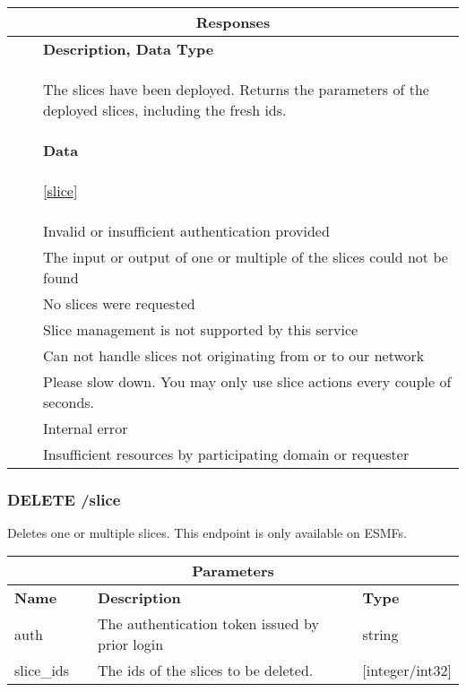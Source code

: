 \begin{longtable}{ |p{1.0cm}|p{3cm}|p{6.44cm}| }
\hline
\multicolumn{3}{|c|}{\textbf{Responses}} \\
 \hline
\centering{\textbf{Code}} & \centering{\textbf{Content Type}} & \textbf{Description, Data Type} \\
\hline
\centering{200} & \centering{application/json} & The slices have been deployed. Returns the parameters of the deployed slices, including the fresh ids.

\paragraph{Data} [\hyperref[esmf_slice]{slice}] \\
 \hline
\endhead
\centering{403} & \centering{text/plain} & Invalid or insufficient authentication provided \\
 \hline
\centering{404} & \centering{text/plain} & The input or output of one or multiple of the slices could not be found \\
 \hline
\centering{417} & \centering{text/plain} & No slices were requested \\
 \hline
\centering{421} & \centering{text/plain} & Slice management is not supported by this service \\
 \hline
\centering{422} & \centering{text/plain} & Can not handle slices not originating from or to our network \\
 \hline
\centering{429} & \centering{text/plain} & Please slow down. You may only use slice actions every couple of seconds. \\
 \hline
\centering{500} & \centering{text/plain} & Internal error \\
 \hline
\centering{507} & \centering{text/plain} & Insufficient resources by participating domain or requester \\
 \hline
\end{longtable}

\newpage
\subsubsection{DELETE /slice}
Deletes one or multiple slices. This endpoint is only available on ESMFs.
\begin{longtable}{ |p{2.5cm}|p{1.5cm}|p{4cm}|p{2cm}| }
\hline
\multicolumn{4}{|c|}{\textbf{Parameters}} \\
 \hline
\textbf{Name} & \centering{\textbf{Location}} & \textbf{Description} & \textbf{Type} \\
\hline
auth & \centering{QUERY} & The authentication token issued by prior login & string \\
 \hline
slice\_ids & \centering{QUERY} & The ids of the slices to be deleted. & [integer/int32] \\
 \hline
\endhead \end{longtable}


